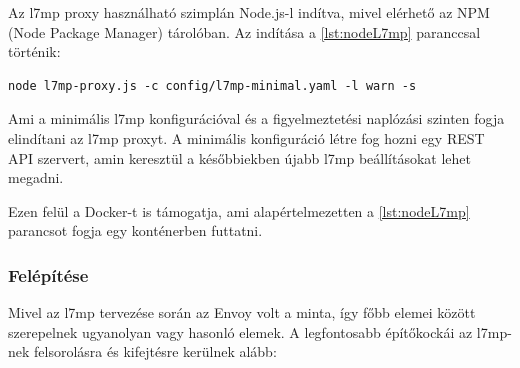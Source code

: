 Az l7mp proxy használható szimplán Node.js-l indítva, mivel elérhető az NPM (Node 
Package Manager) tárolóban. Az indítása a \ref{lst:nodeL7mp} paranccsal történik: 

\begin{lstlisting}[caption=L7mp indítása Node.js segítségével, label=lst:nodeL7mp]
	node l7mp-proxy.js -c config/l7mp-minimal.yaml -l warn -s
\end{lstlisting}

Ami a minimális l7mp konfigurációval és a figyelmeztetési naplózási szinten fogja
elindítani az l7mp proxyt. A minimális konfiguráció létre fog hozni egy REST API
szervert, amin keresztül a későbbiekben újabb l7mp beállításokat lehet megadni.

Ezen felül a Docker-t is támogatja, ami alapértelmezetten a \ref{lst:nodeL7mp} parancsot fogja
egy konténerben futtatni.

\subsubsection{Felépítése}

Mivel az l7mp tervezése során az Envoy volt a minta, így főbb elemei között szerepelnek
ugyanolyan vagy hasonló elemek. A legfontosabb építőkockái az l7mp-nek 
felsorolásra és kifejtésre kerülnek alább: 

